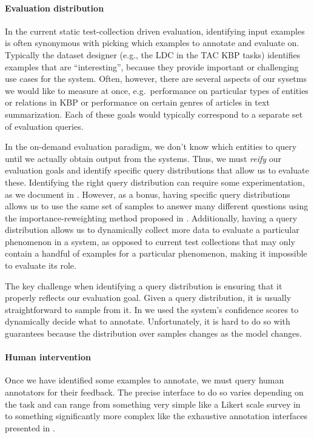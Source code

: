 \paragraph{Evaluation distribution}
In the current static test-collection driven evaluation, identifying input examples is often synonymous with picking which examples to annotate and evaluate on.
Typically the dataset designer (e.g., the LDC in the TAC KBP tasks) identifies examples that are ``interesting'', because they provide important or challenging use cases for the system.
Often, however, there are several aspects of our sysetms we would like to measure at once, e.g.\ performance on particular types of entities or relations in KBP or performance on certain genres of articles in text summarization.
Each of these goals would typically correspond to a separate set of evaluation queries. 

In the on-demand evaluation paradigm, we don't know which entities to query until we actually obtain output from the systems.
Thus, we must \textit{reify} our evaluation goals and identify specific query distributions that allow us to evaluate these.
Identifying the right query distribution can require some experimentation, as we document in .
However, as a bonus, having specific query distributions allows us to use the same set of samples to answer many different questions using the importance-reweighting method proposed in . 
Additionally, having a query distribution allows us to dynamically collect more data to evaluate a particular phenomenon in a system, as opposed to current test collections that may only contain a handful of examples for a particular phenomenon, making it impossible to evaluate its role.

The key challenge when identifying a query distribution is ensuring that it properly reflects our evaluation goal.
Given a query distribution, it is usually straightforward to sample from it.
In  we used the system's confidence scores to dynamically decide what to annotate.
Unfortunately, it is hard to do so with guarantees because the distribution over samples changes as the model changes. 

\paragraph{Human intervention}
Once we have identified some examples to annotate, we must query human annotators for their feedback.
The precise interface to do so varies depending on the task and can range from something very simple like a Likert scale survey in  to something significantly more complex like the exhaustive annotation interfaces presented in .

